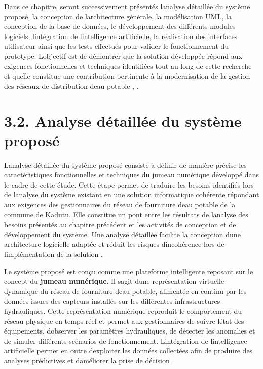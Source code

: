 \documentclass[12pt,a4paper,oneside]{report}
\begin{document}
Dans ce chapitre, seront successivement présentés
l\textquotesingle analyse détaillée du système proposé, la conception de
l\textquotesingle architecture générale, la modélisation UML, la
conception de la base de données, le développement des différents
modules logiciels, l\textquotesingle intégration de
l\textquotesingle intelligence artificielle, la réalisation des
interfaces utilisateur ainsi que les tests effectués pour valider le
fonctionnement du prototype. L\textquotesingle objectif est de démontrer
que la solution développée répond aux exigences fonctionnelles et
techniques identifiées tout au long de cette recherche et
qu\textquotesingle elle constitue une contribution pertinente à la
modernisation de la gestion des réseaux de distribution
d\textquotesingle eau potable \cite{ref106}, \cite{ref17}.

\section{\texorpdfstring{\textbf{3.2. Analyse détaillée du système
proposé}}{3.2. Analyse détaillée du système proposé}}\label{analyse-duxe9tailluxe9e-du-systuxe8me-proposuxe9}

L\textquotesingle analyse détaillée du système proposé consiste à
définir de manière précise les caractéristiques fonctionnelles et
techniques du jumeau numérique développé dans le cadre de cette étude.
Cette étape permet de traduire les besoins identifiés lors de
l\textquotesingle analyse du système existant en une solution
informatique cohérente répondant aux exigences des gestionnaires du
réseau de fourniture d\textquotesingle eau potable de la commune de
Kadutu. Elle constitue un pont entre les résultats de
l\textquotesingle analyse des besoins présentés au chapitre précédent et
les activités de conception et de développement du système. Une analyse
détaillée facilite la conception d\textquotesingle une architecture
logicielle adaptée et réduit les risques d\textquotesingle incohérence
lors de l\textquotesingle implémentation de la solution \cite{ref106}.

Le système proposé est conçu comme une plateforme intelligente reposant
sur le concept du \textbf{jumeau numérique}. Il s\textquotesingle agit
d\textquotesingle une représentation virtuelle dynamique du réseau de
fourniture d\textquotesingle eau potable, alimentée en continu par les
données issues des capteurs installés sur les différentes
infrastructures hydrauliques. Cette représentation numérique reproduit
le comportement du réseau physique en temps réel et permet aux
gestionnaires de suivre l\textquotesingle état des équipements,
d\textquotesingle observer les paramètres hydrauliques, de détecter les
anomalies et de simuler différents scénarios de fonctionnement.
L\textquotesingle intégration de l\textquotesingle intelligence
artificielle permet en outre d\textquotesingle exploiter les données
collectées afin de produire des analyses prédictives et
d\textquotesingle améliorer la prise de décision \cite{ref17}.
\end{document}
